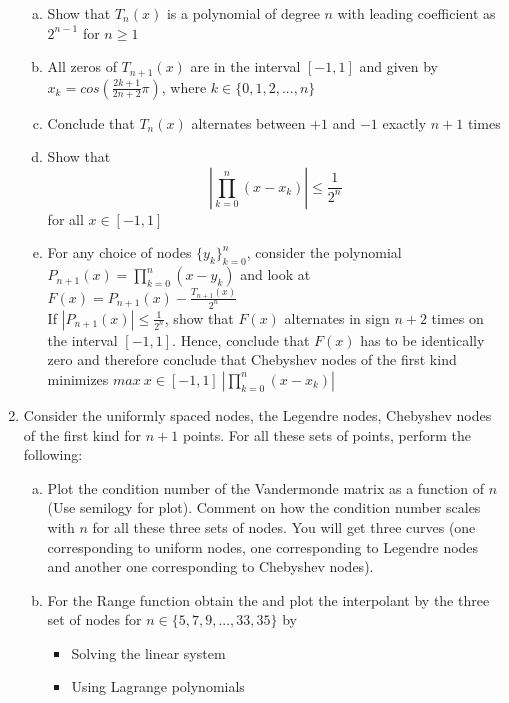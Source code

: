 \documentclass{article}
\begin{document}
\begin{enumerate}
\begin{enumerate}[(a)]
\item Show that $T_{n}(x)$ is a polynomial of degree $n$ with leading coefficient as $2^{n-1}$ for $n \geq 1$

\item All zeros of $T_{n+1}(x)$ are in the interval $[-1, 1]$ and given by $x_{k} = cos \left( \displaystyle \frac{2k+1}{2n+2} \pi \right)$, where $k \in \{0,1,2,...,n\}$

\item Conclude that $T_{n}(x)$ alternates between $+1$ and $-1$ exactly $n+1$ times
\item Show that
    $$\displaystyle \left| \prod_{k=0}^{n} (x - x_{k}) \right| \leq \frac{1}{2^{n}}$$
for all $x \in [-1, 1]$


\item For any choice of nodes $\{y_{k}\}_{k=0}^{n}$, consider the polynomial $P_{n+1}(x) = \displaystyle \prod_{k=0}^{n} (x - y_{k})$ and look at $F(x) = P_{n+1}(x) -
    \displaystyle \frac{T_{n+1}(x)}{2^{n}}$ \\

If $\displaystyle |P_{n+1}(x)| \leq  \frac{1}{2^{n}}$, show that $F(x)$ alternates in sign $n+2$ times on the interval $[-1, 1]$. Hence, conclude that $F(x)$ has to be identically zero and 
therefore conclude that Chebyshev nodes of the first kind minimizes $max \ x \in [-1, 1] \  \left| \displaystyle \prod_{k=0}^{n} (x - x_{k}) \right|$
\end{enumerate}

\item Consider the uniformly spaced nodes, the Legendre nodes, Chebyshev nodes of the first kind for $n+1$ points. For all these sets of points, perform the following:

\begin{enumerate}[(a)]
\item Plot the condition number of the Vandermonde matrix as a function of $n$ (Use semilogy for plot). Comment on how the condition number scales with $n$ for all these three sets of nodes. You will get three curves (one corresponding to uniform nodes, one corresponding to Legendre nodes and another one corresponding to Chebyshev nodes).
\item For the Range function obtain the and plot the interpolant by the three set of nodes for $n \in \{5,7,9,...,33,35\}$ by

\begin{itemize}
\item Solving the linear system
\item Using Lagrange polynomials
\end{itemize}


\end{enumerate}
\end{enumerate}
\end{document}
